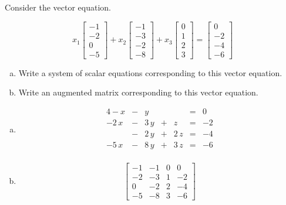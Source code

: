 
\begin{exerciseStatement}


Consider the vector equation.

\[ x_{1} \left[\begin{array}{c}
-1 \\
-2 \\
0 \\
-5
\end{array}\right] + x_{2} \left[\begin{array}{c}
-1 \\
-3 \\
-2 \\
-8
\end{array}\right] + x_{3} \left[\begin{array}{c}
0 \\
1 \\
2 \\
3
\end{array}\right] = \left[\begin{array}{c}
0 \\
-2 \\
-4 \\
-6
\end{array}\right] \]
\begin{enumerate}[(a)]
\item  Write a system of scalar equations corresponding to this vector equation. 
\item  Write an augmented matrix corresponding to this vector equation. 
\end{enumerate}
    
\end{exerciseStatement}
    
\begin{exerciseAnswer} 

\begin{enumerate}[(a)]
\item 
\begin{alignat*}{4} -x &-& y & &  &=& 0 \\-2 \, x &-& 3 \, y &+& z &=& -2 \\ &-& 2 \, y &+& 2 \, z &=& -4 \\-5 \, x &-& 8 \, y &+& 3 \, z &=& -6 \\ \end{alignat*}
            
\item \[ \left[\begin{array}{ccc|c}
-1 & -1 & 0 & 0 \\
-2 & -3 & 1 & -2 \\
0 & -2 & 2 & -4 \\
-5 & -8 & 3 & -6
\end{array}\right] \]
\end{enumerate}
    
\end{exerciseAnswer}
    
